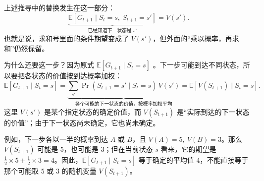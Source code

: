 \documentclass[UTF8]{ctexart}
\begin{document}
上述推导中的替换发生在这一部分：
\[
\underbrace{\mathbb E[G_{t+1}\mid S_t=s,\ S_{t+1}=s']}_{\text{已经知道下一状态是 }s'}
=V(s').
\]
也就是说，求和号里面的条件期望变成了 \(V(s')\)，但外面的“乘以概率，再求和”仍然保留。

为什么还要这一步？因为原式 \(\mathbb E[G_{t+1}\mid S_t=s]\) 。下一步可能到达不同状态，所以要把各状态的价值按到达概率加权：
\[
\mathbb E[G_{t+1}\mid S_t=s]
=
\underbrace{\sum_{s'}\Pr(S_{t+1}=s'\mid S_t=s)\,V(s')}_{\text{各个可能的下一状态的价值，按概率加权平均}}
=
\mathbb E[V(S_{t+1})\mid S_t=s].
\]
这里 \(V(s')\) 是某个指定状态的确定价值，而 \(V(S_{t+1})\) 是“实际到达的下一状态的价值”；由于下一状态尚未确定，它也尚未确定。

例如，下一步各以一半的概率到达 \(A\) 或 \(B\)，且 \(V(A)=5,\ V(B)=3\)。那么 \(V(S_{t+1})\) 可能是 \(5\)，也可能是 \(3\)；但在当前状态 \(s\) 看来，它的期望是 \(\tfrac12\times5+\tfrac12\times3=4\)。因此，\(\mathbb E[G_{t+1}\mid S_t=s]\) 等于确定的平均值 \(4\)，不能直接等于那个可能取 \(5\) 或 \(3\) 的随机变量 \(V(S_{t+1})\)。
\end{document}
